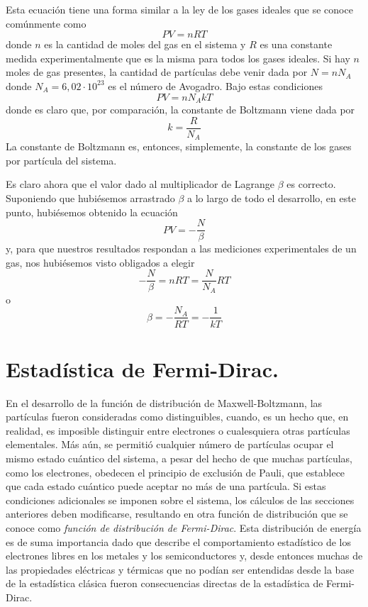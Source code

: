 \documentclass[12pt,a4paper]{article}
\begin{document}
Esta ecuación tiene una forma similar a la ley de los gases ideales que se conoce comúnmente como
\[ PV=nRT \]
donde $n$ es la cantidad de moles del gas en el sistema y $R$ es una constante medida experimentalmente que es la misma para todos los gases ideales. Si hay $n$ moles de gas presentes, la cantidad de partículas debe venir dada por $N=nN_{A}$ donde $N_{A}=6,02 \cdot 10^{23}$ es el número de Avogadro. Bajo estas condiciones
\[ PV=nN_{A}kT \]
donde es claro que, por comparación, la constante de Boltzmann viene dada por
\[ k=\frac{R}{N_{A}} \]
La constante de Boltzmann es, entonces, simplemente, la constante de los gases por partícula del sistema.

Es claro ahora que el valor dado al multiplicador de Lagrange $\beta$ es correcto. Suponiendo que hubiésemos arrastrado $\beta$ a lo largo de todo el desarrollo, en este punto, hubiésemos obtenido la ecuación
\[ PV=-\frac{N}{\beta} \]
y, para que nuestros resultados respondan a las mediciones experimentales de un gas, nos hubiésemos visto obligados a elegir
\[ -\frac{N}{\beta}=nRT=\frac{N}{N_{A}}RT \]
o
\[ \beta = -\frac{N_{A}}{RT}=-\frac{1}{kT} \]

\section{Estadística de Fermi-Dirac.}

En el desarrollo de la función de distribución de Maxwell-Boltzmann, las partículas fueron consideradas como distinguibles, cuando, es un hecho que, en realidad, es imposible distinguir entre electrones o cualesquiera otras partículas elementales. Más aún, se permitió cualquier número de partículas ocupar el mismo estado cuántico del sistema, a pesar del hecho de que muchas partículas, como los electrones, obedecen el principio de exclusión de Pauli, que establece que cada estado cuántico puede aceptar no más de una partícula. Si estas condiciones adicionales se imponen sobre el sistema, los cálculos de las secciones anteriores deben modificarse, resultando en otra función de distribución que se conoce como \emph{función de distribución de Fermi-Dirac}. Esta distribución de energía es de suma importancia dado que describe el comportamiento estadístico de los electrones libres en los metales y los semiconductores y, desde entonces muchas de las propiedades eléctricas y térmicas que no podían ser entendidas desde la base de la estadística clásica fueron consecuencias directas de la estadística de Fermi-Dirac.
\end{document}
